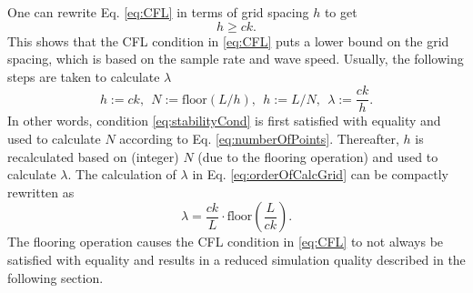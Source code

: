 \documentclass[dvipsnames, reprint]{JASA}
\begin{document}
One can rewrite Eq. \eqref{eq:CFL} in terms of grid spacing $h$ to get
\begin{equation}\label{eq:stabilityCond}
    h \geq ck.
\end{equation}
This shows that the CFL condition in \eqref{eq:CFL} puts a lower bound on the grid spacing, which is based on the sample rate and wave speed. Usually, the following steps are taken to calculate $\lambda$
\begin{equation}\label{eq:orderOfCalcGrid}
    h := ck,\ \ N := \text{floor}(L/h), \ \ h := L/N, \ \ \lambda := \frac{ck}{h}.
\end{equation}
In other words, condition \eqref{eq:stabilityCond} is first satisfied with equality and used to calculate $N$ according to Eq. \eqref{eq:numberOfPoints}. Thereafter, $h$ is recalculated based on (integer) $N$ (due to the flooring operation) and used to calculate $\lambda$. The calculation of $\lambda$ in Eq. \eqref{eq:orderOfCalcGrid} can be compactly rewritten as
\begin{equation}\label{eq:compactLambda}
    \lambda = \frac{ck}{L}\cdot\text{floor}\left(\frac{L}{ck}\right).
\end{equation}
The flooring operation causes the CFL condition in \eqref{eq:CFL} to not always be satisfied with equality and results in a reduced simulation quality described in the following section.
\end{document}
